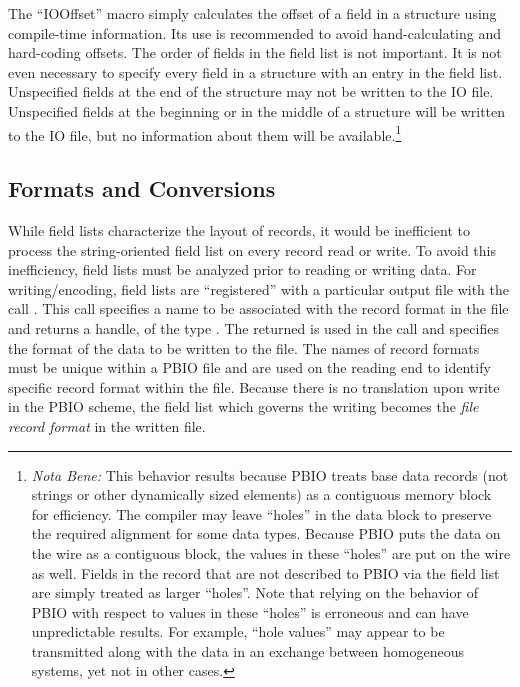 The ``IOOffset'' macro simply calculates the offset of a field in a structure
using compile-time information.  Its use is recommended to avoid
hand-calculating and hard-coding offsets.  The order of fields in the field
list is not important.  It is not even necessary to specify every field
in a structure with an entry in the field list. Unspecified fields at the end
of the structure may not be written to the IO file.  Unspecified fields
at the beginning or in the middle of a structure will be written to the IO
file, but no information about them will be available.\footnote{{\it Nota
Bene:} This behavior results because PBIO treats base data records (not
strings or other dynamically sized elements) as a contiguous memory block
for efficiency.  The compiler may leave ``holes'' in the data block to
preserve the required alignment for some data types.  Because PBIO puts the
data on the wire as a contiguous block, the values in these ``holes'' are put
on the wire as well.  Fields in the record that are not described to PBIO
via the field list are simply treated as larger ``holes''.  Note that
relying on the behavior of PBIO with respect to values in these ``holes''
is erroneous and can have unpredictable results.  For example, ``hole
values'' may appear to be transmitted along with the data in an exchange
between homogeneous systems, yet not in other cases.}
\subsection{Formats and Conversions}

While field lists characterize the layout of records, it would be inefficient
to process the string-oriented field list on every record read or write.  To
avoid this inefficiency, field lists must be analyzed prior to reading or
writing data.  For writing/encoding, field lists are ``registered'' with a
particular output file with the call .  This
call specifies a name to be associated with the record format in the file and
returns a handle, of the type .  The returned  is used in
the 
 call and specifies the format of the data to be written to the
file.  The names of record formats must be unique within a PBIO file and are
used on the reading end to identify specific record format within the file.
Because there is no translation upon write in the PBIO scheme, the field list
which governs the writing  becomes the {\it file record format} in
the written file.

